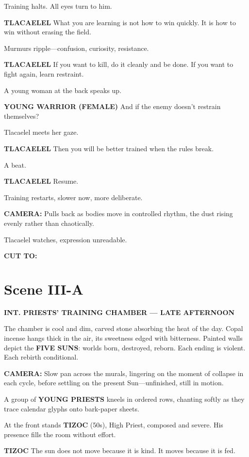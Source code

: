 \documentclass[12pt]{article}
\begin{document}
Training halts. All eyes turn to him.

\textbf{TLACAELEL}  
What you are learning is not how to win quickly.  
It is how to win without erasing the field.

Murmurs ripple—confusion, curiosity, resistance.

\textbf{TLACAELEL}  
If you want to kill, do it cleanly and be done.  
If you want to fight again, learn restraint.

A young woman at the back speaks up.

\textbf{YOUNG WARRIOR (FEMALE)}  
And if the enemy doesn’t restrain themselves?

Tlacaelel meets her gaze.

\textbf{TLACAELEL}  
Then you will be better trained  
when the rules break.

A beat.

\textbf{TLACAELEL}  
Resume.

Training restarts, slower now, more deliberate.

\textbf{CAMERA:} Pulls back as bodies move in controlled rhythm, the dust rising evenly rather than chaotically.

Tlacaelel watches, expression unreadable.

\textbf{CUT TO:}

\section*{Scene III-A}

\textbf{INT. PRIESTS’ TRAINING CHAMBER — LATE AFTERNOON}

The chamber is cool and dim, carved stone absorbing the heat of the day. Copal incense hangs thick in the air, its sweetness edged with bitterness. Painted walls depict the \textbf{FIVE SUNS}: worlds born, destroyed, reborn. Each ending is violent. Each rebirth conditional.

\textbf{CAMERA:} Slow pan across the murals, lingering on the moment of collapse in each cycle, before settling on the present Sun—unfinished, still in motion.

A group of \textbf{YOUNG PRIESTS} kneels in ordered rows, chanting softly as they trace calendar glyphs onto bark-paper sheets.

At the front stands \textbf{TIZOC} (50s), High Priest, composed and severe. His presence fills the room without effort.

\textbf{TIZOC}  
The sun does not move because it is kind.  
It moves because it is fed.
\end{document}
